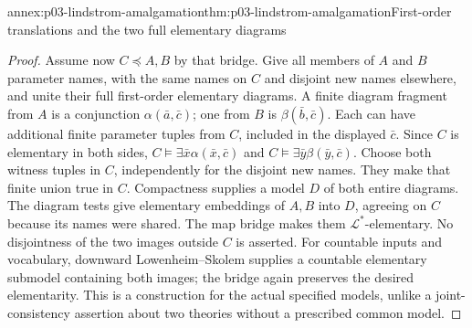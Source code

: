 \begin{annexitem}{annex:p03-lindstrom-amalgamation}{thm:p03-lindstrom-amalgamation}{First-order translations and the two full elementary diagrams}
\begin{proof}
Assume now \(C\preccurlyeq A,B\) by that bridge. Give all members
of \(A\) and \(B\) parameter names, with the same names on \(C\)
and disjoint new names elsewhere, and unite their full first-order
elementary diagrams. A finite diagram fragment from \(A\) is a
conjunction \(\alpha(\bar a,\bar c)\); one from \(B\) is
\(\beta(\bar b,\bar c)\). Each can have additional finite parameter
tuples from \(C\), included in the displayed \(\bar c\). Since
\(C\) is elementary in both sides,
\(C\models\exists\bar x\alpha(\bar x,\bar c)\) and
\(C\models\exists\bar y\beta(\bar y,\bar c)\). Choose both
witness tuples in \(C\), independently for the disjoint new names.
They make that finite union true in \(C\). Compactness supplies a model
\(D\) of both entire diagrams. The diagram tests give elementary
embeddings of \(A,B\) into \(D\), agreeing on \(C\) because its
names were shared. The map bridge makes them \(\mathcal L^*\)-elementary.
No disjointness of the two images outside \(C\) is asserted.
For countable inputs and vocabulary, downward Lowenheim--Skolem supplies
a countable elementary submodel containing both images; the bridge again
preserves the desired elementarity. This is a construction for the actual
specified models, unlike a joint-consistency assertion about two theories
without a prescribed common model.
\end{proof}
\end{annexitem}

